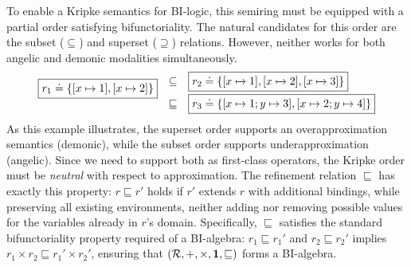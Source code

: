 To enable a Kripke semantics for BI-logic, this semiring must be
equipped with a partial order satisfying bifunctoriality.  The natural
candidates for this order are the subset ($\subseteq$) and superset
($\supseteq$) relations.  However, neither works for both angelic and
demonic modalities simultaneously.  
\begin{equation}
\label{eq:kripke-neutrality}
\begin{array}{c @ {\hspace{1em}} c @ {\hspace{1em}} l}
  \multirow{2}{*}{$\boxed{r_1 \doteq \{[x \mapsto 1], [x \mapsto 2]\}}$}
  & \subseteq
  & \boxed{r_2 \doteq \{[x \mapsto 1], [x \mapsto 2], [x \mapsto 3]\}} \\[0.5em]
  & \sqsubseteq
  & \boxed{r_3 \doteq \{[x \mapsto 1; y \mapsto 3], [x \mapsto 2; y \mapsto 4]\}}
\end{array}
\end{equation}
  As this example illustrates, the superset order supports an
overapproximation semantics (demonic), while the subset order supports
underapproximation (angelic).  Since we need to support both as
first-class operators, the Kripke order must be \emph{neutral} with
respect to approximation.  The refinement relation $\sqsubseteq$ has
exactly this property: $r \sqsubseteq r'$ holds if $r'$ extends $r$
with additional bindings, while preserving all existing environments,
neither adding nor removing possible values for the variables already
in $r$'s domain.  Specifically, $\sqsubseteq$ satisfies the standard
bifunctoriality property required of a BI-algebra:
$r_1 \sqsubseteq r_1'$ and $r_2 \sqsubseteq r_2'$ implies
$r_1 \times r_2 \sqsubseteq r_1' \times r_2'$, ensuring that
$(\mathcal{R}, +, \times, \mathbf{1}, \sqsubseteq)$ forms a BI-algebra.


